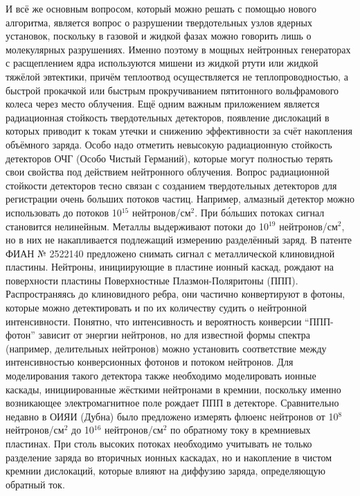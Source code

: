 \documentclass[a4paper,12pt]{article}
\begin{document}
\begin{large}
   И всё же основным вопросом, который можно решать с помощью нового алгоритма, является вопрос о разрушении твердотельных узлов ядерных установок, поскольку в газовой и жидкой фазах можно говорить лишь о молекулярных разрушениях.
   Именно поэтому в мощных нейтронных генераторах с расщеплением ядра используются мишени из жидкой ртути или жидкой тяжёлой эвтектики, причём теплоотвод осуществляется не теплопроводностью, а быстрой прокачкой или быстрым прокручиванием пятитонного вольфрамового колеса через место облучения.
   Ещё одним важным приложением является радиационная стойкость твердотельных детекторов, появление дислокаций в которых приводит к токам утечки и снижению эффективности за счёт накопления объёмного заряда.
   Особо надо отметить невысокую радиационную стойкость детекторов ОЧГ (Особо Чистый Германий), которые могут полностью терять свои свойства под действием нейтронного облучения.
   Вопрос радиационной стойкости детекторов тесно связан с созданием твердотельных детекторов для регистрации очень больших потоков частиц.
   Например, алмазный детектор можно использовать до потоков 10$^{15}$ нейтронов/см$^2$.
   При б\'{о}льших потоках сигнал становится нелинейным.
   Металлы выдерживают потоки до 10$^{19}$ нейтронов/см$^2$, но в них не накапливается подлежащий измерению разделённый заряд.
   В патенте ФИАН № 2522140 предложено снимать сигнал с металлической клиновидной пластины.
   Нейтроны, инициирующие в пластине ионный каскад, рождают на поверхности пластины Поверхностные Плазмон-Поляритоны (ППП).
   Распространяясь до клиновидного ребра, они частично конвертируют в фотоны, которые можно детектировать и по их количеству судить о нейтронной интенсивности.
   Понятно, что интенсивность и вероятность конверсии ``ППП-фотон'' зависит от энергии нейтронов, но для известной формы спектра (например, делительных нейтронов) можно установить соответствие между интенсивностью конверсионных фотонов и потоком нейтронов.
   Для моделирования такого детектора также необходимо моделировать ионные каскады, инициированные жёсткими нейтронами в кремнии, поскольку именно возникающее электромагнитное поле рождает ППП в детекторе.
   Сравнительно недавно \cite{NSiDet} в ОИЯИ (Дубна) было предложено измерять флюенс нейтронов от 10$^{8}$ нейтронов/см$^2$ до 10$^{16}$ нейтронов/см$^2$ по обратному току в кремниевых пластинах.
   При столь высоких потоках необходимо учитывать не только разделение заряда во вторичных ионных каскадах, но и накопление в чистом кремнии дислокаций, которые влияют на диффузию заряда, определяющую обратный ток.
   

\end{large}
\end{document}
